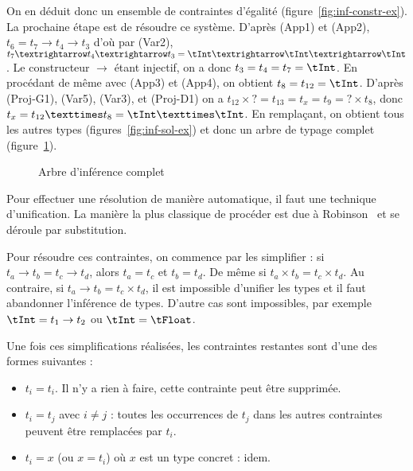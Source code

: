 
On en déduit donc un ensemble de contraintes d'égalité
(figure~\ref{fig:inf-constr-ex}). La prochaine étape est de résoudre ce système.
D'après (App1) et (App2), $t_6 = t_7 → t_4 → t_3$ d'où par (Var2), $t_7 → t_4 →
t_3 = \tInt → \tInt → \tInt$. Le constructeur $→$ étant injectif, on a donc $t_3
= t_4 = t_7 = \tInt$. En procédant de même avec (App3) et (App4), on obtient
$t_8 = t_{12} = \tInt$. D'après (Proj-G1), (Var5), (Var3), et (Proj-D1) on a
$t_{12} × ? = t_{13} = t_{x} = t_9 = ? × t_{8}$, donc $t_x = t_{12} × t_8 =
\tInt × \tInt$. En remplaçant, on obtient tous les autres types
(figures~\ref{fig:inf-sol-ex}) et donc un arbre de typage complet
(figure~\ref{fig:inftree-full}).

\begin{figure} %
\def\disptypeR#1#2{:#2}



\caption{Arbre d'inférence complet}
\label{fig:inftree-full}
\end{figure} %


Pour effectuer une résolution de manière automatique, il faut une technique
d'unification. La manière la plus classique de procéder est due à
Robinson~\cite{robinson} et se déroule par substitution.


\clearpage

Pour résoudre ces contraintes, on commence par les simplifier : si $t_a
\rightarrow t_b = t_c \rightarrow t_d$, alors $t_a = t_c$ et $t_b = t_d$. De
même si $t_a \times t_b = t_c \times t_d$. Au contraire, si $t_a \rightarrow t_b
= t_c \times t_d$, il est impossible d'unifier les types et il faut abandonner
l'inférence de types. D'autre cas sont impossibles, par exemple $\tInt = t_1
\rightarrow t_2$ ou $\tInt = \tFloat$.

Une fois ces simplifications réalisées, les contraintes restantes sont d'une des
formes suivantes :

\begin{itemize}
\item
  $t_i = t_i$. Il n'y a rien à faire, cette contrainte peut être supprimée.
\item
  $t_i = t_j$ avec $i \ne j$ : toutes les occurrences de $t_j$ dans les autres
  contraintes peuvent être remplacées par $t_i$.
\item
  $t_i = x$ (ou $x = t_i$) où $x$ est un type concret : idem.
\end{itemize}

